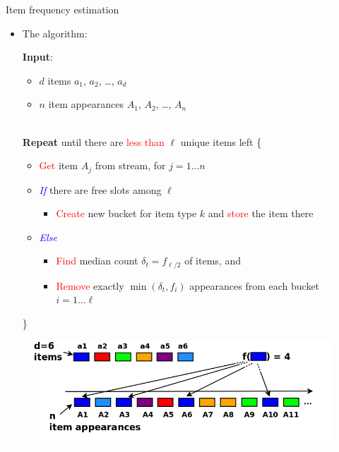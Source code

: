 \documentclass[first=dgreen,second=purple,logo=redque]{aaltoslides}
\begin{document}
\begin{frame}[allowframebreaks=1]{Item frequency estimation}

\begin{itemize}
	\item The algorithm:
	\begin{algorithmic}
		\State \textbf{Input}:\begin{itemize}\item $d$ \textcolor{dgreen}{items} $a_{1}$, $a_{2}$, \ldots,
		$a_{d}$
		\item $n$ \textcolor{dgreen}{item appearances} $A_{1}$, $A_{2}$, \ldots,
		$A_{n}$\end{itemize}
		\\\State \textbf{Repeat} until there are \textcolor{red}{less than}
		$\ell$ \textcolor{dgreen}{unique} items left \{
		\begin{itemize}
			\item \textcolor{red}{Get} item $A_{j}$ from stream, for $j = 1 \ldots n$
		\end{itemize}
		\begin{itemize}
			\item \textcolor{blue}{\textit{If}} there are free slots among $\ell$
			\begin{itemize}\item \textcolor{red}{Create} new bucket for item type $k$ and \textcolor{red}{store} the item there\end{itemize}
			\item \textcolor{blue}{\textit{Else}}
				\begin{itemize}
					\item \textcolor{red}{Find} \textcolor{dgreen}{median} count $\delta_{t} = f_{\ell/2}$
					of items, and
					\item \textcolor{red}{Remove} exactly $\min{(\delta_{t}, f_{i})}$ appearances from each bucket $i = 1 \ldots \ell$
				\end{itemize}
		\end{itemize}
		\State \}
	\end{algorithmic}
\end{itemize}

\framebreak

\begin{figure}
  \includegraphics[scale=0.32]{plots/fi1}
 \label{fig:fi1}
\end{figure}


\end{frame}
\end{document}
